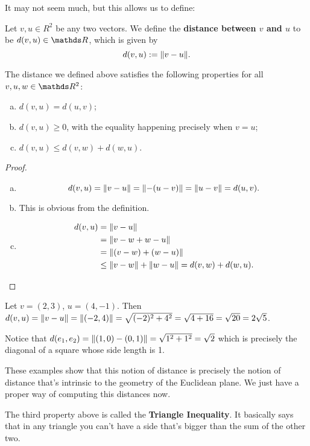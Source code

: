 It may not seem much, but this allows us to define:

\begin{df}
	Let $v,u\in R^2$ be any two vectors. We define the \textbf{distance between $v$ and $u$} to be $d(v,u)\in \R$, which is given by
	\[d(v,u):=\lVert v-u\rVert.\]
\end{df}

\begin{prop}
	The distance we defined above satisfies the following properties for all $v,u,w\in \R^2$:
	\begin{enumerate}[a)]
		\item $d(v,u)=d(u,v)$;
		\item $d(v,u)\geq0$, with the equality happening precisely when $v=u$;
		\item $d(v,u)\leq d(v,w)+d(w,u)$.		
	\end{enumerate}
\end{prop}
\begin{proof}
	\begin{enumerate}[a)]
		\item \[d(v,u)=\lVert v-u\rVert=\lVert-(u-v)\rVert=\lVert u-v\rVert=d(u,v).\]
		
		\item This is obvious from the definition.
		
		\item \begin{align*}
			d(v,u)&=\lVert v-u\rVert\\
			&=\lVert v-w+w-u\rVert\\
			&=\lVert(v-w)+(w-u)\rVert\\
			&\leq \lVert v-w\rVert+\lVert w-u\rVert=d(v,w)+d(w,u).
		\end{align*}
	\end{enumerate}
\end{proof}

\begin{ex}
	Let $v=(2,3)$, $u=(4,-1)$. Then $d(v,u)=\lVert v-u\rVert=\lVert(-2,4)\rVert=\sqrt{(-2)^2+4^2}=\sqrt{4+16}=\sqrt{20}=2\sqrt 5$.
	
	Notice that $d(e_1,e_2)=\lVert(1,0)-(0,1)\rVert=\sqrt{1^2+1^2}=\sqrt{2}$ which is precisely the diagonal of a square whose side length is 1. 
	
	These examples show that this notion of distance is precisely the notion of distance that's intrinsic to the geometry of the Euclidean plane. We just have a proper way of computing this distances now.
\end{ex}

\begin{rmk}
	The third property above is called the \textbf{Triangle Inequality}. It basically says that in any triangle you can't have a side that's bigger than the sum of the other two.
\end{rmk}

